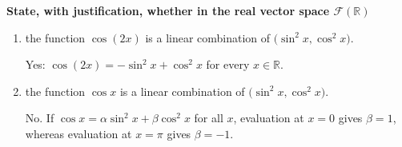 \providecommand{\rank}{\operatorname{r}}
\providecommand{\RR}{\mathbb R}
\providecommand{\CC}{\mathbb C}
\providecommand{\KK}{\mathbb K}

\setcounter{enumi}{68}
\item {\bfseries\boldmath
State, with justification, whether in the real vector space $\mathcal F(\RR)$
}

\begin{enumerate}[label=\alph*)]

\item the function $\cos(2x)$ is a linear combination of $\bigl(\sin^2x,\cos^2x\bigr)$.

\begin{answer}
Yes: $\cos(2x)=-\sin^2x+\cos^2x$ for every $x\in\RR$.
\end{answer}

\item the function $\cos x$ is a linear combination of $\bigl(\sin^2x,\cos^2x\bigr)$.

\begin{answer}
No. If $\cos x=\alpha\sin^2x+\beta\cos^2x$ for all $x$, evaluation
at $x=0$ gives $\beta=1$, whereas evaluation at $x=\pi$ gives $\beta=-1$.
\end{answer}
\end{enumerate}
